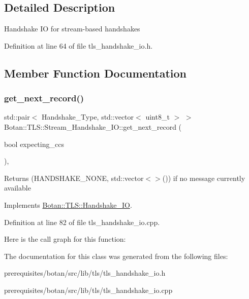 \subsection{Detailed Description}
Handshake IO for stream-\/based handshakes 

Definition at line 64 of file tls\+\_\+handshake\+\_\+io.\+h.



\subsection{Member Function Documentation}
\mbox{\label{class_botan_1_1_t_l_s_1_1_stream___handshake___i_o_aa198869863aa2d98b8a6c89e01e73d4d}} 
\subsubsection{\texorpdfstring{get\+\_\+next\+\_\+record()}{get\_next\_record()}}
{\footnotesize\ttfamily std\+::pair$<$ Handshake\+\_\+\+Type, std\+::vector$<$ uint8\+\_\+t $>$ $>$ Botan\+::\+T\+L\+S\+::\+Stream\+\_\+\+Handshake\+\_\+\+I\+O\+::get\+\_\+next\+\_\+record (\begin{DoxyParamCaption}\item[{bool}]{expecting\+\_\+ccs }\end{DoxyParamCaption})\hspace{0.3cm}{\ttfamily [override]}, {\ttfamily [virtual]}}

Returns (H\+A\+N\+D\+S\+H\+A\+K\+E\+\_\+\+N\+O\+NE, std\+::vector$<$$>$()) if no message currently available 

Implements \mbox{\hyperlink{class_botan_1_1_t_l_s_1_1_handshake___i_o_a3ebecdb050cb44831453dda8498373a8}{Botan\+::\+T\+L\+S\+::\+Handshake\+\_\+\+IO}}.



Definition at line 82 of file tls\+\_\+handshake\+\_\+io.\+cpp.

Here is the call graph for this function\+:


The documentation for this class was generated from the following files\+:\begin{DoxyCompactItemize}
\item 
prerequisites/botan/src/lib/tls/tls\+\_\+handshake\+\_\+io.\+h\item 
prerequisites/botan/src/lib/tls/tls\+\_\+handshake\+\_\+io.\+cpp\end{DoxyCompactItemize}

